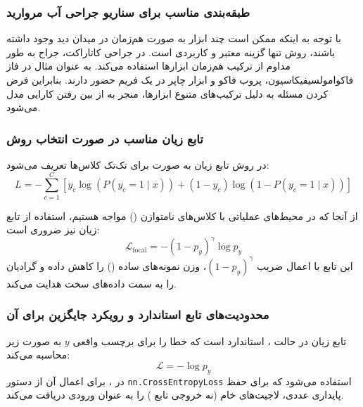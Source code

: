 \documentclass{article}
\begin{document}
\subsubsection{طبقه‌بندی مناسب برای سناریو جراحی آب مروارید}

با توجه به اینکه ممکن است چند ابزار به صورت هم‌زمان در میدان دید وجود داشته باشند، روش  تنها گزینه معتبر و کاربردی است. در جراحی کاتاراکت، جراح به طور مداوم از ترکیب هم‌زمان ابزارها استفاده می‌کند. به عنوان مثال در فاز فاکوامولسیفیکاسیون، پروب فاکو و ابزار چاپر در یک فریم حضور دارند. بنابراین  فرض کردن مسئله به دلیل ترکیب‌های متنوع ابزارها، منجر به از بین رفتن کارایی مدل می‌شود. 


\subsubsection{ تابع زیان مناسب در صورت انتخاب روش }

 در روش  تابع زیان به صورت  برای تک‌تک کلاس‌ها تعریف می‌شود:
$$ L = -\sum_{c=1}^C \left[ y_c \log(P(y_c = 1 \mid x)) + (1 - y_c) \log(1 - P(y_c = 1 \mid x)) \right] $$

از آنجا که در محیط‌های عملیاتی با کلاس‌های نامتوازن () مواجه هستیم، استفاده از تابع زیان  نیز ضروری است:
$$ \mathcal{L}_{\text{focal}} = -(1 - p_y)^\gamma \log p_y $$
این تابع با اعمال ضریب $(1 - p_y)^\gamma$، وزن نمونه‌های ساده () را کاهش داده و گرادیان را به سمت داده‌های سخت  هدایت می‌کند.
\subsubsection{محدودیت‌های تابع  استاندارد و رویکرد جایگزین برای آن}

تابع زیان در حالت ،  استاندارد است که خطا را برای برچسب واقعی $y$ به صورت زیر محاسبه می‌کند:
\[
\mathcal{L} = -\log p_y 
\]
در ، برای اعمال آن از دستور \texttt{nn.CrossEntropyLoss} استفاده می‌شود که برای حفظ پایداری عددی، لاجیت‌های خام (نه خروجی تابع ) را به عنوان ورودی دریافت می‌کند. 
\end{document}
